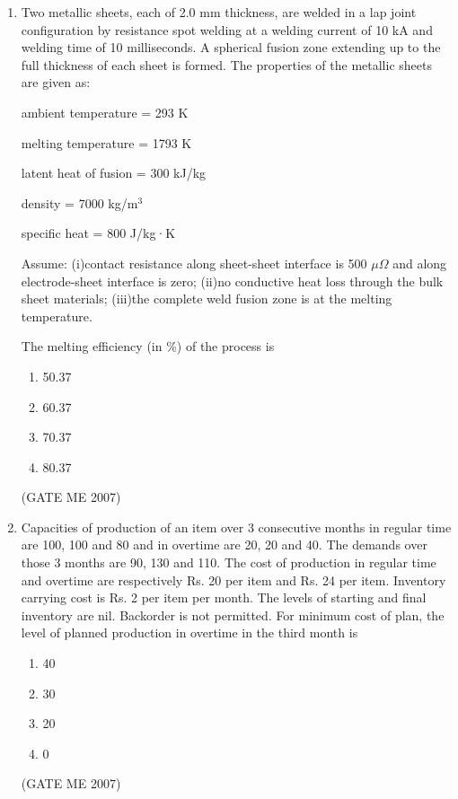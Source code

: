 \documentclass[journal]{IEEEtran}
\begin{document}
\begin{enumerate}
\item Two metallic sheets, each of 2.0 mm thickness, are welded in a lap joint configuration by resistance spot welding at a welding current of 10 kA and welding time of 10 milliseconds. A spherical fusion zone extending up to the full thickness of each sheet is formed. The properties of the metallic sheets are given as:

ambient temperature = 293 K

melting temperature = 1793 K

latent heat of fusion = 300 kJ/kg

density = 7000 kg/m\(^3\)

specific heat = 800 J/kg·K

Assume:
(i)contact resistance along sheet-sheet interface is 500 \( \mu\Omega \) and along electrode-sheet interface is zero;
(ii)no conductive heat loss through the bulk sheet materials;
(iii)the complete weld fusion zone is at the melting temperature.

The melting efficiency (in \%) of the process is
\begin{multicols}{4}
\begin{enumerate}
\item 50.37
\item 60.37
\item 70.37
\item 80.37
\end{enumerate}
\end{multicols}
\hfill (GATE ME 2007)

\item Capacities of production of an item over 3 consecutive months in regular time are 100, 100 and 80 and in overtime are 20, 20 and 40. The demands over those 3 months are 90, 130 and 110. The cost of production in regular time and overtime are respectively Rs. 20 per item and Rs. 24 per item. Inventory carrying cost is Rs. 2 per item per month. The levels of starting and final inventory are nil. Backorder is not permitted. For minimum cost of plan, the level of planned production in overtime in the third month is
\begin{multicols}{4}
\begin{enumerate}
\item 40
\item 30
\item 20
\item 0
\end{enumerate}
\end{multicols}
\hfill (GATE ME 2007)


\end{enumerate}
\end{document}
